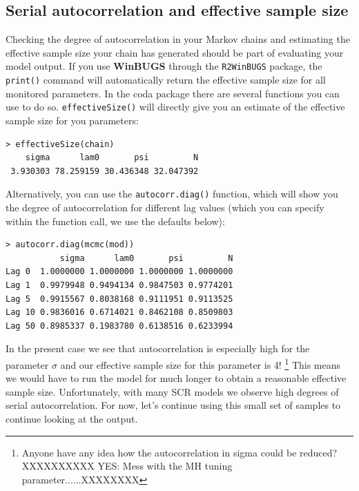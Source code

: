 \subsection{Serial autocorrelation and effective sample size}

Checking the degree of autocorrelation in your Markov chains and 
estimating the effective sample size your chain has generated should 
be part of evaluating your model output. If you use {\bf WinBUGS}
 through the \mbox{\tt R2WinBUGS} package, the \verb#print()# command 
 will automatically return the effective sample size for all monitored 
 parameters. In the coda package there are several functions you can use 
 to do so. \verb#effectiveSize()# will directly give you an estimate 
 of the effective sample size for you parameters:
\begin{verbatim}
> effectiveSize(chain)
    sigma      lam0       psi         N
 3.930303 78.259159 30.436348 32.047392
\end{verbatim}

Alternatively, you can use the \verb#autocorr.diag()# function, which will show you the degree of autocorrelation for different lag values (which you can specify within the function call, we use the defaults below):
\begin{verbatim}
> autocorr.diag(mcmc(mod))
           sigma      lam0       psi         N
Lag 0  1.0000000 1.0000000 1.0000000 1.0000000
Lag 1  0.9979948 0.9494134 0.9847503 0.9774201
Lag 5  0.9915567 0.8038168 0.9111951 0.9113525
Lag 10 0.9836016 0.6714021 0.8462108 0.8509803
Lag 50 0.8985337 0.1983780 0.6138516 0.6233994
\end{verbatim}
In the present case we see that autocorrelation is especially high for the 
parameter $\sigma$ and our effective sample size for this parameter is 
4! \footnote{Anyone have any idea how the autocorrelation in sigma could 
be reduced? XXXXXXXXXX YES: Mess with the MH tuning parameter......XXXXXXXX} 
This means we would have to run the model for much longer to 
obtain a reasonable effective sample size. Unfortunately, with many SCR models we observe high degrees of serial autocorrelation. For now, let's continue using this small set of samples to continue looking at the output.


